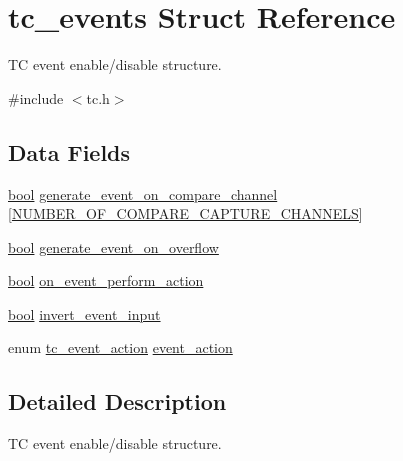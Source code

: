 \hypertarget{structtc__events}{}\section{tc\+\_\+events Struct Reference}
\label{structtc__events}


TC event enable/disable structure.  




{\ttfamily \#include $<$tc.\+h$>$}

\subsection*{Data Fields}
\begin{DoxyCompactItemize}
\item 
\mbox{\hyperlink{group__group__sam0__utils_ga97a80ca1602ebf2303258971a2c938e2}{bool}} \mbox{\hyperlink{structtc__events_a4317ebe6ee0706835fb2146672afd8c8}{generate\+\_\+event\+\_\+on\+\_\+compare\+\_\+channel}} \mbox{[}\mbox{\hyperlink{group__asfdoc__sam0__tc__group_gac837f9db5df1793578c195a979c6a9d3}{N\+U\+M\+B\+E\+R\+\_\+\+O\+F\+\_\+\+C\+O\+M\+P\+A\+R\+E\+\_\+\+C\+A\+P\+T\+U\+R\+E\+\_\+\+C\+H\+A\+N\+N\+E\+LS}}\mbox{]}
\item 
\mbox{\hyperlink{group__group__sam0__utils_ga97a80ca1602ebf2303258971a2c938e2}{bool}} \mbox{\hyperlink{structtc__events_a94a6bf0d78fb0f99a092994a7ec6d2dd}{generate\+\_\+event\+\_\+on\+\_\+overflow}}
\item 
\mbox{\hyperlink{group__group__sam0__utils_ga97a80ca1602ebf2303258971a2c938e2}{bool}} \mbox{\hyperlink{structtc__events_acf7887580241865721933e19311d3af3}{on\+\_\+event\+\_\+perform\+\_\+action}}
\item 
\mbox{\hyperlink{group__group__sam0__utils_ga97a80ca1602ebf2303258971a2c938e2}{bool}} \mbox{\hyperlink{structtc__events_a5d288e8017f6f856d3412544bb2e691f}{invert\+\_\+event\+\_\+input}}
\item 
enum \mbox{\hyperlink{group__asfdoc__sam0__tc__group_ga4dcbf6cdb74bc3b7609ce8d16549462f}{tc\+\_\+event\+\_\+action}} \mbox{\hyperlink{structtc__events_a8d0cfdde8f5a4e2e61865c1f93ca309e}{event\+\_\+action}}
\end{DoxyCompactItemize}


\subsection{Detailed Description}
TC event enable/disable structure. 

